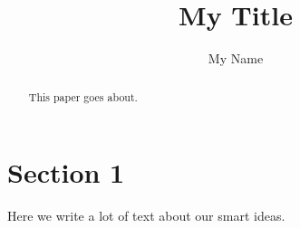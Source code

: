 \documentclass{article}
\begin{document}
	\title{My Title}
	\author{My Name}
\maketitle

\begin{abstract}
	This paper goes about.
\end{abstract}

\section{Section 1}
Here we write a lot of text about our smart ideas.
\cite{Eckert2007}





\end{document}

